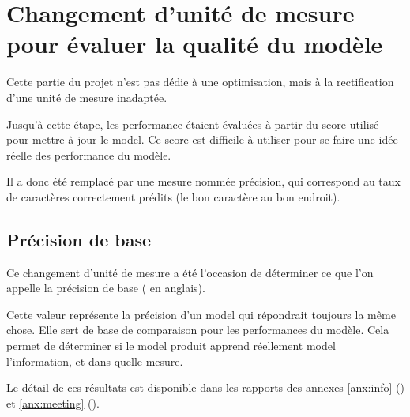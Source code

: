 \section{Changement d'unité de mesure pour évaluer la qualité du modèle}
Cette partie du projet n'est pas dédie à une optimisation, mais à la rectification d'une unité de mesure inadaptée.

Jusqu'à cette étape, les performance étaient évaluées à partir du score utilisé pour mettre à jour le \gls{model}. Ce score est difficile à utiliser pour se faire une idée réelle des performance du modèle. 

Il a donc été remplacé par une mesure nommée \og précision\fg{}, qui correspond au taux de caractères correctement prédits (le bon caractère au bon endroit).

\subsection{Précision de base}
Ce changement d'unité de mesure a été l'occasion de déterminer ce que l'on appelle la précision de base ( en anglais).

Cette valeur représente la précision d'un \gls{model} qui répondrait toujours la même chose. Elle sert de base de comparaison pour les performances du modèle.
Cela permet de déterminer si le \gls{model} produit apprend réellement \gls{model} l'information, et dans quelle mesure.

Le détail de ces résultats est disponible dans les rapports des annexes \ref{anx:info} () et \ref{anx:meeting} ().
